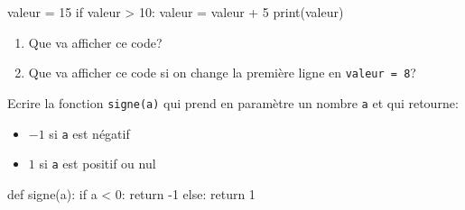 \documentclass[11pt, a4paper]{report}
\begin{document}
\def\level{Premiere}  %
\def\course{NSI}
\def\chaptername{Les conditions IF} %
\def\docname{LP03~--~TD 1}        %

\pagestyle{DS_LP}

\NomPrenom{}

\begin{exercice_cours}
    
    \begin{minipage}{0.38\linewidth}

    \begin{CodePythontexAlt}[TaillePolice = \large, Centre,PremLigne=1]{}
        valeur = 15
        if valeur > 10:
            valeur = valeur + 5
        print(valeur)
    \end{CodePythontexAlt}
    
    \end{minipage}\hfill{}
    \begin{minipage}{0.58\linewidth}
        \begin{enumerate}
            \item Que va afficher ce code? \qquad {}
            \item Que va afficher ce code si on change la première ligne en \verb|valeur = 8|? \qquad {}
        \end{enumerate}
    \end{minipage}
    \end{exercice_cours}


    \begin{minipage}{0.48\linewidth}
        \begin{exercice_cours}
Ecrire la fonction \verb|signe(a)| qui prend en paramètre un nombre \texttt{a} et qui retourne:
    \begin{itemize}
        \item $-1$ si \texttt{a} est négatif
        \item $1$ si \texttt{a} est positif ou nul
    \end{itemize}
    \end{exercice_cours}

    \end{minipage}\hfill
    \begin{minipage}{0.48\linewidth}
\begin{blocvisible}[height=3.5]
    \begin{CodePythontexAlt}[TaillePolice=\large, Largeur=1\linewidth,Centre,Lignes=true,PremLigne=1]{}
def signe(a):
    if a < 0:
        return -1
    else:
        return 1
    \end{CodePythontexAlt}
\end{blocvisible}

    \end{minipage}
\end{document}

